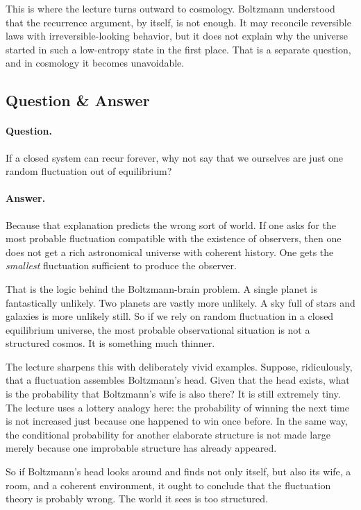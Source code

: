 This is where the lecture turns outward to cosmology. Boltzmann understood that the recurrence argument, by itself, is not enough. It may reconcile reversible laws with irreversible-looking behavior, but it does not explain why the universe started in such a low-entropy state in the first place. That is a separate question, and in cosmology it becomes unavoidable.

\subsection{Question \& Answer}

\paragraph{Question.} If a closed system can recur forever, why not say that we ourselves are just one random fluctuation out of equilibrium?

\paragraph{Answer.} Because that explanation predicts the wrong sort of world. If one asks for the most probable fluctuation compatible with the existence of observers, then one does not get a rich astronomical universe with coherent history. One gets the \emph{smallest} fluctuation sufficient to produce the observer.

That is the logic behind the Boltzmann-brain problem. A single planet is fantastically unlikely. Two planets are vastly more unlikely. A sky full of stars and galaxies is more unlikely still. So if we rely on random fluctuation in a closed equilibrium universe, the most probable observational situation is not a structured cosmos. It is something much thinner.

The lecture sharpens this with deliberately vivid examples. Suppose, ridiculously, that a fluctuation assembles Boltzmann's head. Given that the head exists, what is the probability that Boltzmann's wife is also there? It is still extremely tiny. The lecture uses a lottery analogy here: the probability of winning the next time is not increased just because one happened to win once before. In the same way, the conditional probability for another elaborate structure is not made large merely because one improbable structure has already appeared.

So if Boltzmann's head looks around and finds not only itself, but also its wife, a room, and a coherent environment, it ought to conclude that the fluctuation theory is probably wrong. The world it sees is too structured.

